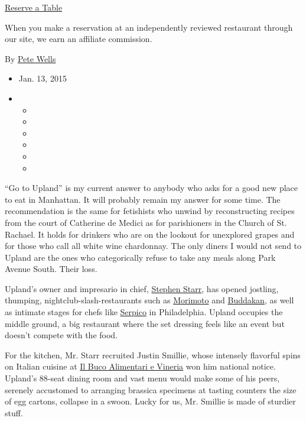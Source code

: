 \href{http://www.opentable.com/single.aspx?ref=4201\&rid=151747}{Reserve
a Table}

When you make a reservation at an independently reviewed restaurant
through our site, we earn an affiliate commission.

By \href{http://www.nytimes3xbfgragh.onion/by/pete-wells}{Pete Wells}

\begin{itemize}
\item
  Jan. 13, 2015
\item
  \begin{itemize}
  \item
  \item
  \item
  \item
  \item
  \item
  \end{itemize}
\end{itemize}

``Go to Upland'' is my current answer to anybody who asks for a good new
place to eat in Manhattan. It will probably remain my answer for some
time. The recommendation is the same for fetishists who unwind by
reconstructing recipes from the court of Catherine de Medici as for
parishioners in the Church of St. Rachael. It holds for drinkers who are
on the lookout for unexplored grapes and for those who call all white
wine chardonnay. The only diners I would not send to Upland are the ones
who categorically refuse to take any meals along Park Avenue South.
Their loss.

Upland's owner and impresario in chief,
\href{http://www.nytimes3xbfgragh.onion/2013/06/12/dining/a-philadelphian-restaurateur-flourishes-in-new-york.html}{Stephen
Starr}, has opened jostling, thumping, nightclub-slash-restaurants such
as
\href{http://www.nytimes3xbfgragh.onion/2006/03/22/dining/reviews/22rest.html}{Morimoto}
and
\href{http://www.nytimes3xbfgragh.onion/2006/05/03/dining/reviews/03rest.html\%20}{Buddakan},
as well as intimate stages for chefs like
\href{http://www.serpicoonsouth.com/}{Serpico} in Philadelphia. Upland
occupies the middle ground, a big restaurant where the set dressing
feels like an event but doesn't compete with the food.

For the kitchen, Mr. Starr recruited Justin Smillie, whose intensely
flavorful spins on Italian cuisine at
\href{http://www.nytimes3xbfgragh.onion/2012/02/15/dining/reviews/il-buco-alimentari-e-vineria-nyc-restaurant-review.html}{Il
Buco Alimentari e Vineria} won him national notice. Upland's 88-seat
dining room and vast menu would make some of his peers, serenely
accustomed to arranging brassica specimens at tasting counters the size
of egg cartons, collapse in a swoon. Lucky for us, Mr. Smillie is made
of sturdier stuff.

